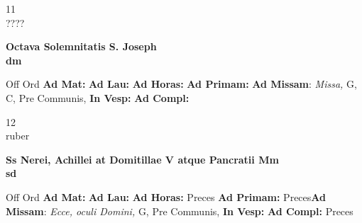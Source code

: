 \documentclass[10pt, openany]{book}
\begin{document}
    \begin{center}
        \begin{minipage}{3.5in}
            \vspace{2em}
            \begin{minipage}{0.5in}
                {\Huge 11} \\
                {\normalsize ????}
            \end{minipage}
            \begin{minipage}{3.0in}
                \textbf{ \large Octava Solemnitatis S. Joseph \\
                \textnormal{\normalsize dm}}

            \end{minipage}
            \begin{justify}Off Ord
                \textbf{Ad Mat: }
                \textbf{Ad Lau: }
                \textbf{Ad Horas: }
                \textbf{Ad Primam: }\textbf{Ad Missam}: \textit{Missa,} G, C, Pre Communis, 
                \textbf{In Vesp: }
                \textbf{Ad Compl: }
            \end{justify}
        \end{minipage}
    \end{center}

    \begin{center}
        \begin{minipage}{3.5in}
            \vspace{2em}
            \begin{minipage}{0.5in}
                {\Huge 12} \\
                {\normalsize ruber}
            \end{minipage}
            \begin{minipage}{3.0in}
                \textbf{ \large Ss Nerei, Achillei at Domitillae V atque Pancratii Mm \\
                \textnormal{\normalsize sd}}

            \end{minipage}
            \begin{justify}Off Ord
                \textbf{Ad Mat: }
                \textbf{Ad Lau: }
                \textbf{Ad Horas: }Preces
                \textbf{Ad Primam: }Preces\textbf{Ad Missam}: \textit{Ecce, oculi Domini,} G, Pre Communis, 
                \textbf{In Vesp: }
                \textbf{Ad Compl: }Preces
            \end{justify}
        \end{minipage}
    \end{center}
\end{document}
